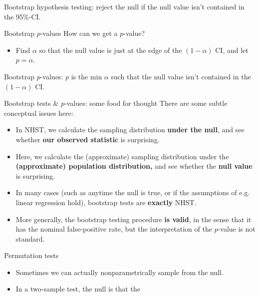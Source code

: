 \documentclass{beamer} %
\begin{document}
\begin{frame}[standout]
Bootstrap hypothesis testing: reject the null if the null value isn't contained in the 95\%-CI.
\end{frame}

\begin{frame}{Bootstrap $p$-values}
How can we get a $p$-value? 
\begin{itemize}[<+(1)->]
\item Find $\alpha$ so that the null value is just at the edge of the $(1-\alpha)$ CI,
 and let $p = \alpha$.
\end{itemize}
\end{frame}

\begin{frame}[standout]
Bootstrap $p$-values: $p$ is the min $\alpha$ such that the null value isn't contained in the $(1-\alpha)$ CI.
\end{frame}

\begin{frame}{Bootstrap tests \& $p$-values: some food for thought}
There are some subtle conceptual issues here:
\begin{itemize}[<+(1)->]
\item In NHST, we calculate the sampling distribution \textbf{under the null}, and see whether \textbf{our observed statistic} is surprising.
\item Here, we calculate the (approximate) sampling distribution under the \textbf{(approximate) population distribution,} and see whether the \textbf{null value} is surprising.
\item In many cases (such as anytime the null is true, or if the assumptions of e.g. linear regression hold), bootstrap tests are \textbf{exactly} NHST.
\item More generally, the bootstrap testing procedure \textbf{is valid}, in the sense that it has the nominal false-positive rate, but the interpretation of the $p$-value is not standard.  
\end{itemize}
\end{frame}

\begin{frame}{Permutation tests}
\begin{itemize}[<+->]
\item Sometimes we can actually nonparametrically sample from the null.
\item In a two-sample test, the null is that the 
\end{itemize}
\end{frame}
\end{document}
